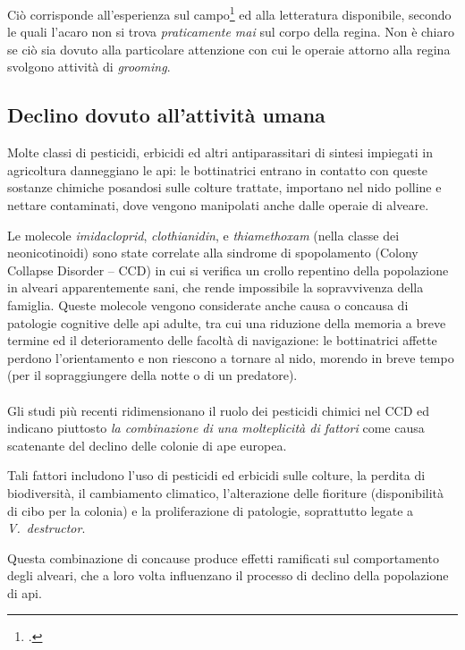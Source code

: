 Ciò corrisponde all'esperienza sul campo\footcite{privFDL,privFPan} ed alla letteratura disponibile, secondo le quali l'acaro non si trova \emph{praticamente mai} sul corpo della regina. Non è chiaro  se ciò sia dovuto alla particolare attenzione con cui le operaie attorno alla regina svolgono attività di \emph{grooming}.

\subsection{Declino dovuto all'attività umana}
Molte classi di pesticidi, erbicidi ed altri antiparassitari di sintesi impiegati in agricoltura danneggiano le api: le bottinatrici entrano in contatto con queste sostanze chimiche posandosi sulle colture trattate, importano nel nido polline e nettare contaminati, dove vengono manipolati anche dalle operaie di alveare.

Le molecole \emph{imidacloprid}, \emph{clothianidin}, e \emph{thiamethoxam} (nella classe dei neonicotinoidi) sono state correlate alla sindrome di spopolamento (Colony Collapse Disorder -- CCD) in cui si verifica un crollo repentino della popolazione in alveari apparentemente sani, che rende impossibile la sopravvivenza della famiglia.
Queste molecole vengono considerate anche causa o concausa di patologie cognitive delle api adulte, tra cui una riduzione della memoria a breve termine ed il deterioramento delle facoltà di navigazione: le bottinatrici affette perdono l'orientamento e non riescono a tornare al nido, morendo in breve tempo (per il sopraggiungere della notte o di un predatore).

\paragraph{}
Gli studi più recenti ridimensionano il ruolo dei pesticidi chimici nel CCD ed indicano piuttosto \emph{la combinazione di una molteplicità di fattori} come causa scatenante del declino delle colonie di ape europea.

Tali fattori includono l'uso di pesticidi ed erbicidi sulle colture, la perdita di biodiversità, il cambiamento climatico, l'alterazione delle fioriture (disponibilità di cibo per la colonia) e la proliferazione di patologie, soprattutto legate a \emph{V.~destructor}.

Questa combinazione di concause produce effetti ramificati sul comportamento degli alveari, che a loro volta influenzano il processo di declino della popolazione di api.

